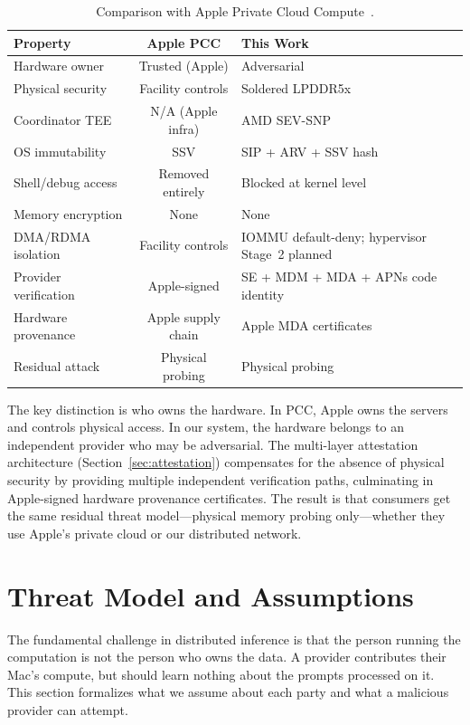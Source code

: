 \documentclass[10pt,twocolumn,letterpaper]{article}
\begin{document}
\begin{table}[h]
\centering
\caption{Comparison with Apple Private Cloud Compute~\cite{apple-pcc}.}
\label{tab:pcc}
\vspace{4pt}
\small
\begin{tabularx}{\linewidth}{@{}l c X@{}}
\toprule
\textbf{Property} & \textbf{Apple PCC} & \textbf{This Work} \\
\midrule
Hardware owner & Trusted (Apple) & Adversarial \\
Physical security & Facility controls & Soldered LPDDR5x \\
Coordinator TEE & N/A (Apple infra) & AMD SEV-SNP \\
OS immutability & SSV & SIP + ARV + SSV hash \\
Shell/debug access & Removed entirely & Blocked at kernel level \\
Memory encryption & None & None \\
DMA/RDMA isolation & Facility controls & IOMMU default-deny; hypervisor Stage~2 planned \\
Provider verification & Apple-signed & SE + MDM + MDA + APNs code identity \\
Hardware provenance & Apple supply chain & Apple MDA certificates \\
Residual attack & Physical probing & Physical probing \\
\bottomrule
\end{tabularx}
\end{table}

The key distinction is who owns the hardware. In PCC, Apple owns the servers and controls physical access. In our system, the hardware belongs to an independent provider who may be adversarial. The multi-layer attestation architecture (Section~\ref{sec:attestation}) compensates for the absence of physical security by providing multiple independent verification paths, culminating in Apple-signed hardware provenance certificates. The result is that consumers get the same residual threat model---physical memory probing only---whether they use Apple's private cloud or our distributed network.

\section{Threat Model and Assumptions}
\label{sec:threat}

The fundamental challenge in distributed inference is that the person running the computation is not the person who owns the data. A provider contributes their Mac's compute, but should learn nothing about the prompts processed on it. This section formalizes what we assume about each party and what a malicious provider can attempt.
\end{document}
